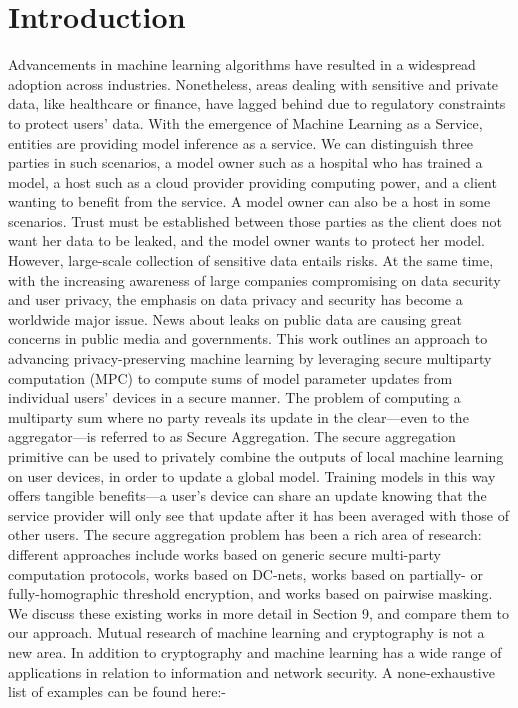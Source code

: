 \documentclass[conference]{IEEEtran}
\begin{document}
\section{Introduction}
Advancements in machine learning algorithms have resulted in a widespread adoption across industries. Nonetheless, areas dealing with sensitive and private data, like healthcare or finance, have lagged behind due to regulatory constraints to protect users’ data.
With the emergence of Machine Learning as a Service, entities are providing model inference as a service. We can distinguish three parties in such scenarios, a model owner such as a hospital who has trained a model, a host such as a cloud provider providing computing power, and a client wanting to benefit from the service. A model owner can also be a host in some scenarios. Trust must be established between those parties as the client does not want her data to be leaked, and the model owner wants to protect her model. However, large-scale collection of sensitive data entails risks. At the same time, with the increasing awareness of large companies compromising on data security and user privacy, the emphasis on data privacy and security has become a worldwide
major issue. News about leaks on public data are causing great concerns in public media and
governments. This work outlines an approach to advancing privacy-preserving machine learning by leveraging secure multiparty computation (MPC) to compute sums of model parameter updates from individual users’ devices in a secure manner. The problem of computing a multiparty sum where no party reveals its update in the clear—even to the aggregator—is referred to as Secure Aggregation. The secure aggregation primitive can be used to privately combine the outputs of local machine learning on user devices, in order to update a global model. Training models in this way offers tangible benefits—a user’s device can share an update knowing that the service provider will only see that update after it has been averaged with those of other users. The secure aggregation problem has been a rich area of research: different approaches include works based on generic secure multi-party computation protocols, works based on DC-nets, works based on partially- or fully-homographic threshold encryption, and works based on pairwise masking. We discuss these existing works in more detail in Section 9, and compare them to our approach. 
Mutual research of machine learning and cryptography is not a new area. In addition to cryptography and machine learning has a wide range of applications in relation to information and network security. A none-exhaustive list of examples can be found here:- 
\end{document}

